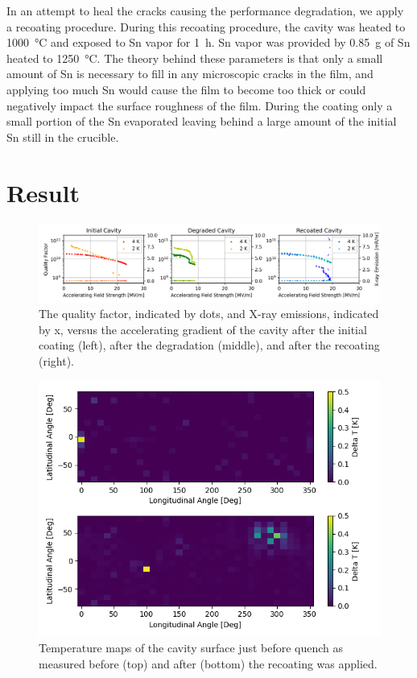 \documentclass{revtex4-2}
\begin{document}
In an attempt to heal the cracks causing the performance degradation, we apply a recoating procedure. During this recoating procedure, the cavity was heated to \qty{1000}{\degreeCelsius} and exposed to Sn vapor for \qty{1}{\hour}. Sn vapor was provided by \qty{0.85}{\gram} of Sn heated to \qty{1250}{\degreeCelsius}. The theory behind these parameters is that only a small amount of Sn is necessary to fill in any microscopic cracks in the film, and applying too much Sn would cause the film to become too thick or could negatively impact the surface roughness of the film. During the coating only a small portion of the Sn evaporated leaving behind a large amount of the initial Sn still in the crucible. 

\section{Result}
\label{sec:Results}

\begin{figure}[h]%
    \centering%
    \includegraphics[width=1.0\columnwidth]{./figures/VTS.png}%
    \caption{The quality factor, indicated by dots, and X-ray emissions, indicated by x, versus the accelerating gradient of the cavity after the initial coating (left), after the degradation (middle), and after the recoating (right).}%
    \label{fig:VTS}%
\end{figure}

\begin{figure}[h]%
    \centering%
    \includegraphics{./figures/TMAP.png}%
    \caption{Temperature maps of the cavity surface just before quench as measured before (top) and after (bottom) the recoating was applied.}%
    \label{fig:VTS}%
\end{figure}
\end{document}
